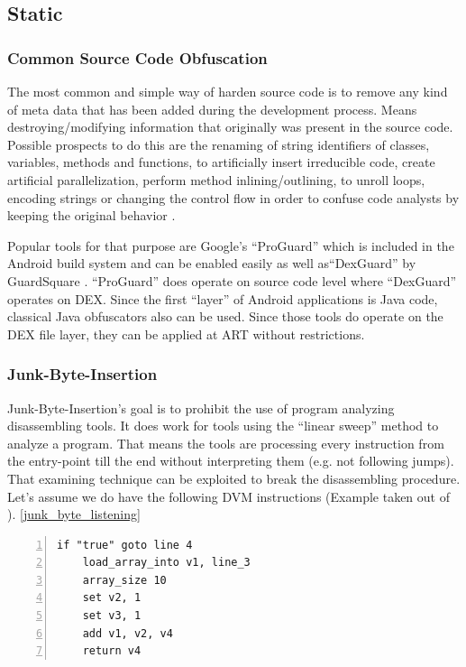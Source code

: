 \subsection{Static}
\subsubsection{Common Source Code Obfuscation}
The most common and simple way of harden source code is to remove any kind of meta data
that has been added during the development process. Means destroying/modifying
information that originally was present in the source code.
Possible prospects to do this are the renaming of string identifiers of
classes, variables, methods and functions, to artificially insert
irreducible code, create artificial parallelization, perform method inlining/outlining, to unroll loops, encoding strings or changing the control flow in
order to confuse code analysts by keeping the original behavior
\parencite[p.87]{lvl_imp}.

Popular tools for that purpose are Google's ``ProGuard''
\parencite{proguardtool} which is included in the Android build system and
can be enabled easily as well as``DexGuard'' by GuardSquare
\parencite{dexguardtool}. ``ProGuard'' does
operate on source code level where ``DexGuard'' operates on DEX.
Since the first ``layer'' of Android applications is Java code, classical Java
obfuscators also can be used.
Since those tools do operate on the DEX file layer, they can be applied at ART without restrictions.

\subsubsection{Junk-Byte-Insertion}
Junk-Byte-Insertion's goal is to prohibit the use of program analyzing
disassembling tools. It does work for tools using the
``linear sweep'' method to analyze a program. That means
the tools are processing every instruction from the entry-point
till the end without interpreting them (e.g. not following jumps).
That examining technique can be exploited to break the disassembling
procedure. Let's assume we do have the following DVM instructions (Example taken out of \parencite[p.67]{lvl_imp}).
\autoref{junk_byte_listening}
  \begin{lstlisting}[language={[x64]Assembler}, caption=Junk-Byte-Insertion, label=junk_byte_listening, numbers=left]
    if "true" goto line 4
    load_array_into v1, line_3
    array_size 10
    set v2, 1
    set v3, 1
    add v1, v2, v4
    return v4
  \end{lstlisting}

